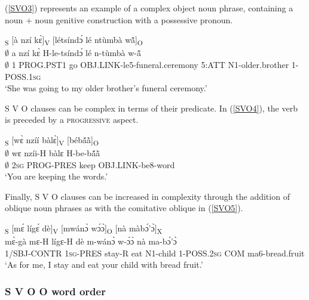 \noindent (\ref{SVO3}) represents an example of a complex object noun phrase, containing a noun + noun genitive construction with a possessive pronoun.

\begin{exe} 
\ex\label{SVO3} 
  \glll [$\emptyset$]\textsubscript{S} [à nzí kɛ̀]\textsubscript{V} [létsíndɔ́ lé ntùmbà wã̂]\textsubscript{O} \\
      $\emptyset$  a nzí kɛ̀ H-le-tsíndɔ́ lé n-tùmbà w-ã̂ \\
       $\emptyset$  1 PROG.PST1 go OBJ.LINK-le5-funeral.ceremony 5:ATT N1-older.brother 1-POSS.1\textsc{sg}   \\
    \trans `She was going to my older brother's funeral ceremony.'
\end{exe}

S V O clauses can be complex in terms of their predicate. In (\ref{SVO4}), the verb is preceded by a \textsc{progressive} aspect.

\begin{exe} 
\ex\label{SVO4} 
  \glll  [$\emptyset$]\textsubscript{S} [wɛ̀ nzíí bàlɛ̀]\textsubscript{V} [bébã́ã̀]\textsubscript{O} \\
    $\emptyset$  wɛ nzíi-H bàlɛ H-be-bã́ã̀ \\
      $\emptyset$      2\textsc{sg} PROG-PRES keep OBJ.LINK-be8-word \\
    \trans `You are keeping the words.'
\end{exe}

Finally, S V O clauses can be increased in complexity through the addition of oblique noun phrases as with the comitative oblique in (\ref{SVO5}).


\begin{exe} 
\ex\label{SVO5}
  \glll  [mɛ̀gà]\textsubscript{S} [mɛ́ lígɛ́ dè]\textsubscript{V} [mwánɔ̀ wɔ́ɔ̀]\textsubscript{O} [nà màbɔ́'ɔ̀]\textsubscript{X}  \\
        mɛ̀-gà mɛ-H lígɛ-H dè m-wánɔ̀ w-ɔ́ɔ̀ nà ma-bɔ́'ɔ̀ \\
          1/SBJ-CONTR 1\textsc{sg}-PRES stay-R eat N1-child 1-POSS.2\textsc{sg} COM ma6-bread.fruit \\
    \trans `As for me, I stay and eat your child with bread fruit.'
\end{exe}








\subsubsection{S V O O word order}
\label{sec:SVOO}

